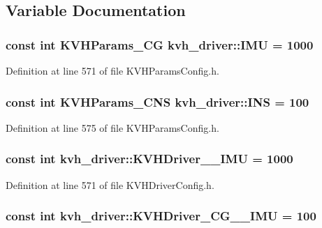 \subsection{\-Variable \-Documentation}
\subsubsection[{\-I\-M\-U}]{\setlength{\rightskip}{0pt plus 5cm}const int \-K\-V\-H\-Params\-\_\-\-C\-G {\bf kvh\-\_\-driver\-::\-I\-M\-U} = 1000}\label{namespacekvh__driver_a0fd5a58a43bdfb53060a96905f42b535}


\-Definition at line 571 of file \-K\-V\-H\-Params\-Config.\-h.

\subsubsection[{\-I\-N\-S}]{\setlength{\rightskip}{0pt plus 5cm}const int \-K\-V\-H\-Params\-\_\-\-C\-N\-S {\bf kvh\-\_\-driver\-::\-I\-N\-S} = 100}\label{namespacekvh__driver_a890ee9041645a980e5f8a5c93d32af52}


\-Definition at line 575 of file \-K\-V\-H\-Params\-Config.\-h.

\subsubsection[{\-K\-V\-H\-Driver\-\_\-1750\-\_\-\-I\-M\-U}]{\setlength{\rightskip}{0pt plus 5cm}const int {\bf kvh\-\_\-driver\-::\-K\-V\-H\-Driver\-\_\-\_\-\-I\-M\-U} = 1000}\label{namespacekvh__driver_a849ca325ea69f2124a47a48ea634fa9c}


\-Definition at line 571 of file \-K\-V\-H\-Driver\-Config.\-h.

\subsubsection[{\-K\-V\-H\-Driver\-\_\-\-C\-G\-\_\-5100\-\_\-\-I\-M\-U}]{\setlength{\rightskip}{0pt plus 5cm}const int {\bf kvh\-\_\-driver\-::\-K\-V\-H\-Driver\-\_\-\-C\-G\-\_\-\_\-\-I\-M\-U} = 100}\label{namespacekvh__driver_afcf5792aa6e1573525f2221c64d9bc58}


